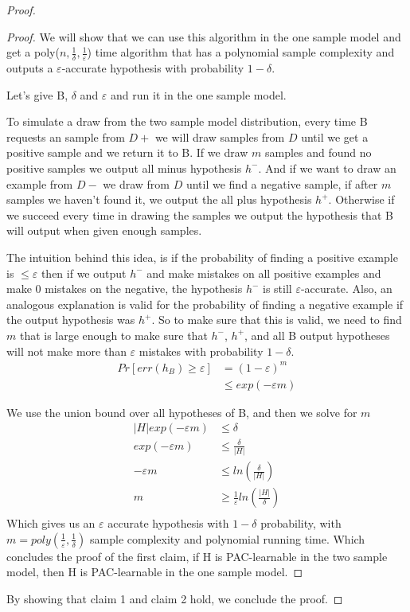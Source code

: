 \documentclass[]{homework}
\begin{document}
\begin{proof}
\begin{proof}
We will show that we can use this algorithm in the one sample model and get a poly($n, \frac{1}{\delta}, \frac{1}{\varepsilon}$) time algorithm that has a polynomial sample complexity and outputs a $\varepsilon$-accurate hypothesis with probability $1-\delta$. 

Let's give B, $\delta$ and $\varepsilon$ and run it in the one sample model.

To simulate a draw from the two sample model distribution, every time B requests an sample from $D+$ we will draw samples from $D$ until we get a positive sample and we return it to B. If we draw $m$ samples and found no positive samples we output all minus hypothesis $h^-$. And if we want to draw an example from $D-$ we draw from $D$ until we find a negative sample, if after $m$ samples we haven't found it, we output the all plus hypothesis $h^+$. Otherwise if we succeed every time in drawing the samples we output the hypothesis that B will output when given enough samples. 

The intuition behind this idea, is if the probability of finding a positive example is $\leq \varepsilon$ then if we output $h^-$ and make mistakes on all positive examples and make 0 mistakes on the negative, the hypothesis $h^-$ is still $\varepsilon$-accurate. Also, an analogous explanation is valid for the probability of finding a negative example if the output hypothesis was $h^+$.  So to make sure that this is valid, we need to find $m$ that is large enough to make sure that $h^-$, $h^+$, and all B output hypotheses will not make more than $\varepsilon$ mistakes with probability $1-\delta$.
\begin{align*}
    Pr[err(h_B) \geq \varepsilon] &= (1-\varepsilon)^m \\
                                  &\leq exp(-\varepsilon m) 
\end{align*}

We use the union bound over all hypotheses of B, and then we solve for $m$
\begin{align*}
     |H|exp(-\varepsilon m)  &\leq \delta \\
     exp(-\varepsilon m)  &\leq \frac{\delta}{|H|} \\
     -\varepsilon m  &\leq ln(\frac{\delta}{|H|}) \\
     m  &\geq \frac{1}{\varepsilon}ln(\frac{|H|}{\delta}) \\
\end{align*}
Which gives us an $\varepsilon$ accurate hypothesis with $1-\delta$ probability, with $m = poly(\frac{1}{\varepsilon},\frac{1}{\delta})$ sample complexity and polynomial running time. Which concludes the proof of the first claim, if H is PAC-learnable in the two sample model, then H is PAC-learnable in the one sample model. 
\end{proof}

By showing that claim 1 and claim 2 hold, we conclude the proof. 
\end{proof}
\end{document}
